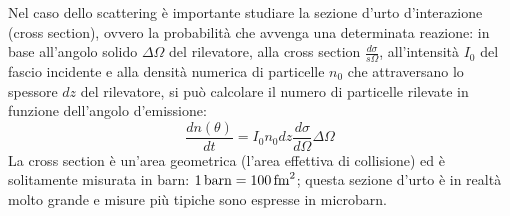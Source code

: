 Nel caso dello scattering è importante studiare la sezione d'urto d'interazione (cross section), ovvero la probabilità che avvenga una determinata reazione: in base all'angolo solido $ \Delta\Omega $ del rilevatore, alla cross section $ \frac{d\sigma}{s\Omega} $, all'intensità $ I_0 $ del fascio incidente e alla densità numerica di particelle $ n_0 $ che attraversano lo spessore $ dz $ del rilevatore, si può calcolare il numero di particelle rilevate in funzione dell'angolo d'emissione:
\begin{equation}
  \frac{dn(\theta)}{dt} = I_0 n_0 dz \frac{d\sigma}{d\Omega} \Delta\Omega
  \label{eq:1}
\end{equation}
La cross section è un'area geometrica (l'area effettiva di collisione) ed è solitamente misurata in barn: $ 1\,\text{barn} = 100\,\text{fm}^2 $; questa sezione d'urto è in realtà molto grande e misure più tipiche sono espresse in microbarn.

\thispagestyle{introd}
